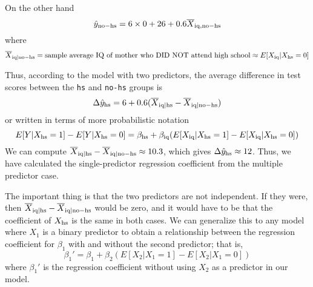\begin{example}
On the other hand 
\begin{equation*}
\hat{y}_{\rm no-hs} =  6 \times 0 + 26  +  0.6 \overline{X}_{{\rm iq},{\rm no-hs}} 
\end{equation*}
where 
\begin{equation*}
\overline{X}_{{\rm iq}|{\rm no-hs}}  = \text{sample average IQ of mother who DID NOT attend high school} \approx  E[X_{\rm iq}|X_{\rm hs}=0]
\end{equation*}


Thus, according to the model with two predictors, the average difference in test scores between the \verb!hs! and \verb!no-hs! groups is 
\begin{equation*}
\Delta \hat{y}_{\rm hs} = 6 +0.6(\overline{X}_{{\rm iq}|{\rm hs}}-\overline{X}_{{\rm iq}|{\rm no-hs}} )
\end{equation*}
or written in terms of more probabilistic notation 
\begin{equation*}
E[Y|X_{\rm hs} = 1]-E[Y|X_{\rm hs} = 0]  = \beta_{\rm hs} + \beta_{\rm iq}(E[X_{\rm iq}|X_{\rm hs} = 1]-E[X_{\rm iq}|X_{\rm hs} = 0]  )
\end{equation*}
We can compute $\overline{X}_{{\rm iq}|{\rm hs}}-\overline{X}_{{\rm iq}|{\rm no-hs}} \approx 10.3$, which gives $\Delta \hat{y}_{\rm hs} \approx 12$. Thus, we have calculated the single-predictor regression coefficient from the multiple predictor case.  





\end{example}




  
  
The important thing is that the two predictors are not independent. If they were, then $\overline{X}_{{\rm iq}|{\rm hs}}-\overline{X}_{{\rm iq}|{\rm no-hs}}$ would be zero, and it would have to be that the coefficient of $X_{\rm hs}$ is the same in both cases. We can generalize this to any model where $X_1$ is a binary predictor to obtain a relationship between the regression coefficient for $\beta_1$ with and without the second predictor; that is, 
\begin{equation}\label{eq:beta-single-multiA}
\beta_1' = \beta_1 + \beta_2(E[X_2|X_1=1]-E[X_2|X_1=0])
\end{equation}
where $\beta_1'$ is the regression coefficient without using $X_2$ as a predictor in our model. 
 
